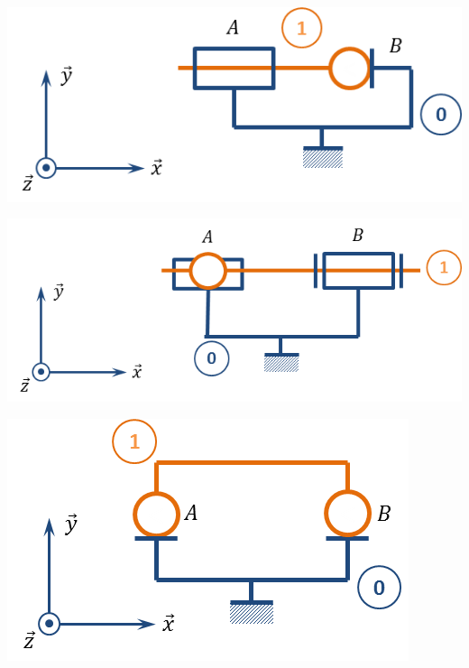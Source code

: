 \documentclass[10pt]{article}
\begin{document}
\begin{minipage}[c]{.32\linewidth}
\begin{center}
\includegraphics[width=.95\textwidth]{images/fig_01}
\end{center}
\end{minipage}\hfill
\begin{minipage}[c]{.32\linewidth}
\begin{center}
\includegraphics[width=.95\textwidth]{images/fig_02}
\end{center}
\end{minipage}\hfill
\begin{minipage}[c]{.32\linewidth}
\begin{center}
\includegraphics[width=.95\textwidth]{images/fig_03}
\end{center}
\end{minipage}
\end{document}
